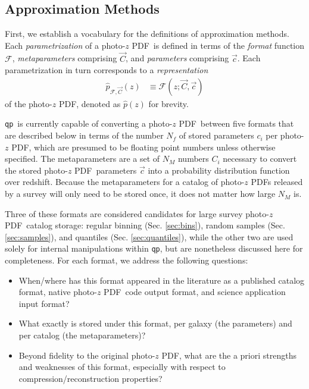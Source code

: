 \documentclass[\docopts]{\docclass}
\newcommand{\qp}{\texttt{qp}}
\newcommand{\pz}{photo-$z$ PDF}
\begin{document}
\subsection{Approximation Methods}
\label{sec:approx}


First, we establish a vocabulary for the definitions of approximation methods.  
Each \textit{parametrization} of a \pz\ is defined in terms of the 
\textit{format} function $\mathcal{F}$, \textit{metaparameters} comprising 
$\vec{C}$, and \textit{parameters} comprising $\vec{c}$.  Each parametrization 
in turn corresponds to a \textit{representation}
\begin{align}
  \label{eq:definition}
  \hat{p}_{\mathcal{F}, \vec{C}}(z) &\equiv \mathcal{F}(z;\vec{C}, \vec{c})
\end{align}
of the \pz, denoted as $\hat{p}(z)$ for brevity.

\qp\ is currently capable of converting a \pz\ between five formats that are 
described below in terms of the number $N_{f}$ of stored parameters $c_{i}$ per 
\pz, which are presumed to be floating point numbers unless otherwise 
specified.  The metaparameters are a set of $N_{M}$ numbers $C_{i}$ necessary 
to convert the stored \pz\ parameters $\vec{c}$ into a probability distribution 
function over redshift.  Because the metaparameters for a catalog of \pz s 
released by a survey will only need to be stored once, it does not matter how 
large $N_{M}$ is.  

Three of these formats are considered candidates for large survey \pz\ catalog 
storage: regular binning (Sec. \ref{sec:bins}), random samples (Sec. 
\ref{sec:samples}), and quantiles (Sec. \ref{sec:quantiles}), while the other 
two are used solely for internal manipulations within \qp, but are nonetheless 
discussed here for completeness.  For each format, we address the following 
questions:

\begin{itemize}
  \item When/where has this format appeared in the literature as a published 
catalog format, native \pz\ code output format, and science application input 
format?
  \item What exactly is stored under this format, per galaxy (the parameters) 
and per catalog (the metaparameters)?
  \item Beyond fidelity to the original \pz, what are the a priori strengths 
and weaknesses of this format, especially with respect to 
compression/reconstruction properties?
\end{itemize}
\end{document}
